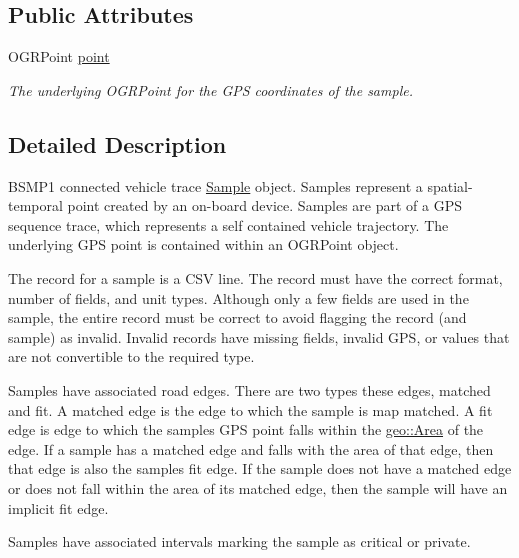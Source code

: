\subsection*{Public Attributes}
\begin{DoxyCompactItemize}
\item 
O\+G\+R\+Point \hyperlink{classgeo__data_1_1Sample_abb1a8679c0f245bc614b7f5168af3f8d}{point}\hypertarget{classgeo__data_1_1Sample_abb1a8679c0f245bc614b7f5168af3f8d}{}\label{classgeo__data_1_1Sample_abb1a8679c0f245bc614b7f5168af3f8d}

\begin{DoxyCompactList}\small\item\em The underlying O\+G\+R\+Point for the G\+PS coordinates of the sample. \end{DoxyCompactList}\end{DoxyCompactItemize}


\subsection{Detailed Description}
B\+S\+M\+P1 connected vehicle trace \hyperlink{classgeo__data_1_1Sample}{Sample} object. Samples represent a spatial-\/temporal point created by an on-\/board device. Samples are part of a G\+PS sequence trace, which represents a self contained vehicle trajectory. The underlying G\+PS point is contained within an O\+G\+R\+Point object.

The record for a sample is a C\+SV line. The record must have the correct format, number of fields, and unit types. Although only a few fields are used in the sample, the entire record must be correct to avoid flagging the record (and sample) as invalid. Invalid records have missing fields, invalid G\+PS, or values that are not convertible to the required type.

Samples have associated road edges. There are two types these edges, matched and fit. A matched edge is the edge to which the sample is map matched. A fit edge is edge to which the sample\textquotesingle{}s G\+PS point falls within the \hyperlink{classgeo_1_1Area}{geo\+::\+Area} of the edge. If a sample has a matched edge and falls with the area of that edge, then that edge is also the sample\textquotesingle{}s fit edge. If the sample does not have a matched edge or does not fall within the area of its matched edge, then the sample will have an implicit fit edge.

Samples have associated intervals marking the sample as critical or private.

